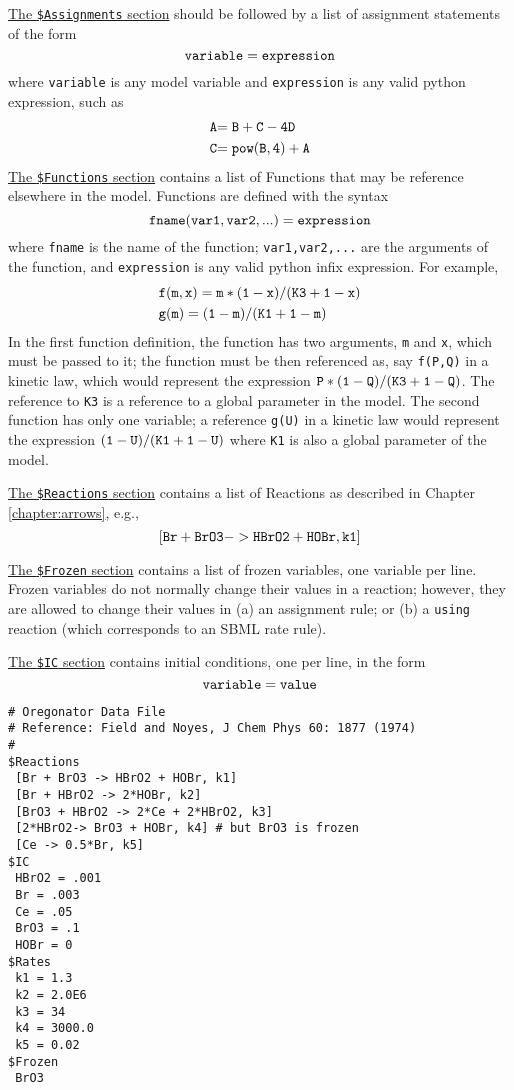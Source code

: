 \underline{The {\tt \$Assignments} section} should be followed by a list of assignment statements of the form 
$${\tt variable = expression}$$
where {\tt variable} is any model variable and {\tt expression} is any valid python expression, such as 
\begin{align*}
	{\tt A} &{\tt = B+C-4D}\\
	{\tt C} &{\tt =pow(B,4)+A}
\end{align*}
\underline{The {\tt \$Functions} section} contains a list of Functions that may be reference elsewhere in the model. Functions are defined with the syntax
$${\tt fname(var1,var2,...) = expression}$$
where {\tt fname} is the name of the function; {\tt var1,var2,...} are the arguments of the function, and {\tt expression} is any valid python infix expression. For example, 
\begin{align*}
    & {\tt f(m,x) =  m * (1-x)/(K3+1-x)}\\
    & {\tt g(m) = (1-m)/(K1+1-m)}
\end{align*}
In the first function definition, the function has two arguments, {\tt m} and {\tt x}, which must be passed to it; the function must be then referenced as, say {\tt f(P,Q)} in a kinetic law, which would represent the expression ${\tt P*(1-Q)/(K3+1-Q)}$. The reference to {\tt K3} is a reference to a global parameter in the model. The second function has only one variable; a reference {\tt g(U)} in a kinetic law would represent the expression ${\tt (1-U)/(K1+1-U)}$ where {\tt K1} is also a global parameter of the model. 


\underline{The {\tt \$Reactions} section} contains a list of Reactions as described in Chapter \ref{chapter:arrows}, e.g., 
$$ {\tt  [Br + BrO3 -> HBrO2 + HOBr, k1] }$$

\underline{The {\tt \$Frozen} section} contains a list of frozen variables, one variable per line. Frozen variables do not normally change their values in a reaction; however, they are allowed to change their values in (a) an assignment rule; or (b) a {\tt using} reaction (which corresponds to an SBML rate rule). 
	
\underline{The {\tt \$IC} section} contains initial conditions, one per line, in the form 
$${\tt variable = value}$$	
	
\begin{Verbatim}[frame=single]
# Oregonator Data File
# Reference: Field and Noyes, J Chem Phys 60: 1877 (1974)
#
$Reactions
 [Br + BrO3 -> HBrO2 + HOBr, k1] 
 [Br + HBrO2 -> 2*HOBr, k2]
 [BrO3 + HBrO2 -> 2*Ce + 2*HBrO2, k3] 
 [2*HBrO2-> BrO3 + HOBr, k4] # but BrO3 is frozen
 [Ce -> 0.5*Br, k5]
$IC
 HBrO2 = .001
 Br = .003
 Ce = .05
 BrO3 = .1
 HOBr = 0
$Rates
 k1 = 1.3
 k2 = 2.0E6
 k3 = 34
 k4 = 3000.0
 k5 = 0.02
$Frozen
 BrO3
\end{Verbatim}

